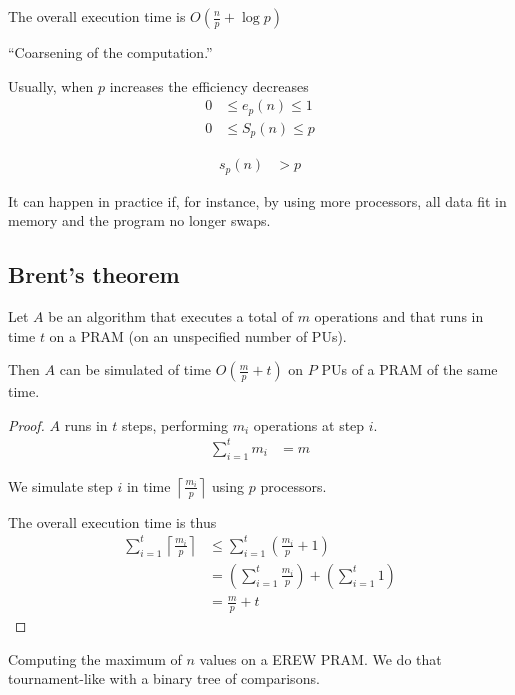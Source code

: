 The overall execution time is $O\left(\frac{n}{p} + \log p\right)$

``Coarsening of the computation.''

 Usually, when $p$ increases the efficiency decreases
\begin{align*}
0 &\leq e_p(n) \leq 1\\
0 &\leq S_p(n) \leq p
\end{align*}

\begin{align*}
s_p(n) & > p
\end{align*}

It can happen in practice if, for instance, by using more processors, all data fit in memory and the program no longer swaps.


\subsection{Brent's theorem}

\begin{thm}
Let $A$ be an algorithm that executes a total of $m$
 operations and that runs in time $t$ on a PRAM (on an unspecified number of PUs).

Then $A$ can be simulated of time $O\left( \frac{m}{p}+t\right)$ on $P$ PUs of a PRAM of the same time.
\end{thm}

\begin{proof}
$A$ runs in $t$ steps, performing $m_i$ operations at step $i$.
\begin{align*}
\sum_{i=1}^t m_i & = m
\end{align*}

We simulate step $i$ in time $\left\lceil \frac{m_i}{p}\right\rceil$ using $p$ processors.

The overall execution time is thus 
\begin{align*}
\sum_{i=1}^t \left\lceil \frac{m_i}{p}\right\rceil & \leq \sum_{i=1}^t \left(\frac{m_i}{p}+1\right)\\
& = \left( \sum_{i=1}^t \frac{m_i}{p}\right) + \left( \sum_{i=1}^t 1\right)\\
& = \frac{m}{p} + t
\end{align*}
\end{proof}

Computing the maximum of $n$ values on a EREW PRAM. We do that tournament-like with a binary tree of comparisons.

